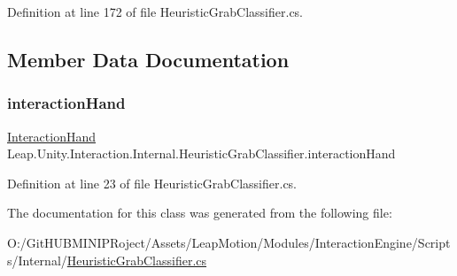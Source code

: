Definition at line 172 of file Heuristic\+Grab\+Classifier.\+cs.



\subsection{Member Data Documentation}
\mbox{\label{class_leap_1_1_unity_1_1_interaction_1_1_internal_1_1_heuristic_grab_classifier_a5448b1cba99694cc212019b370ba38ef}} 
\subsubsection{\texorpdfstring{interactionHand}{interactionHand}}
{\footnotesize\ttfamily \mbox{\hyperlink{class_leap_1_1_unity_1_1_interaction_1_1_interaction_hand}{Interaction\+Hand}} Leap.\+Unity.\+Interaction.\+Internal.\+Heuristic\+Grab\+Classifier.\+interaction\+Hand}



Definition at line 23 of file Heuristic\+Grab\+Classifier.\+cs.



The documentation for this class was generated from the following file\+:\begin{DoxyCompactItemize}
\item 
O\+:/\+Git\+H\+U\+B\+M\+I\+N\+I\+P\+Roject/\+Assets/\+Leap\+Motion/\+Modules/\+Interaction\+Engine/\+Scripts/\+Internal/\mbox{\hyperlink{_heuristic_grab_classifier_8cs}{Heuristic\+Grab\+Classifier.\+cs}}\end{DoxyCompactItemize}
